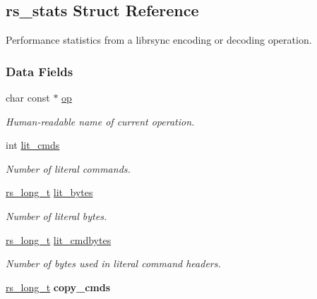 \hypertarget{structrs__stats}{
\subsection{rs\_\-stats Struct Reference}
\label{structrs__stats}
}
Performance statistics from a librsync encoding or decoding operation.  


\subsubsection*{Data Fields}
\begin{CompactItemize}
\item 
char const $\ast$ \hyperlink{structrs__stats_7bea565f5d1687eb6b953b518034d43c}{op}
\begin{CompactList}\small\item\em Human-readable name of current operation. \item\end{CompactList}\item 
int \hyperlink{structrs__stats_0126775feaafac1539f519ac56346713}{lit\_\-cmds}
\begin{CompactList}\small\item\em Number of literal commands. \item\end{CompactList}\item 
\hyperlink{librsync-config_8h_6edddd44ca74c10ea65ef82d116e0ffa}{rs\_\-long\_\-t} \hyperlink{structrs__stats_f21a0846d6bafd18f6f592862808fac4}{lit\_\-bytes}
\begin{CompactList}\small\item\em Number of literal bytes. \item\end{CompactList}\item 
\hyperlink{librsync-config_8h_6edddd44ca74c10ea65ef82d116e0ffa}{rs\_\-long\_\-t} \hyperlink{structrs__stats_30dfcfe89000e028ca4054c8501879fc}{lit\_\-cmdbytes}
\begin{CompactList}\small\item\em Number of bytes used in literal command headers. \item\end{CompactList}\item 
\hypertarget{structrs__stats_6ade0b71046b937d5caa10247842fe54}{
\hyperlink{librsync-config_8h_6edddd44ca74c10ea65ef82d116e0ffa}{rs\_\-long\_\-t} \textbf{copy\_\-cmds}}
\label{structrs__stats_6ade0b71046b937d5caa10247842fe54}


\end{CompactItemize}
